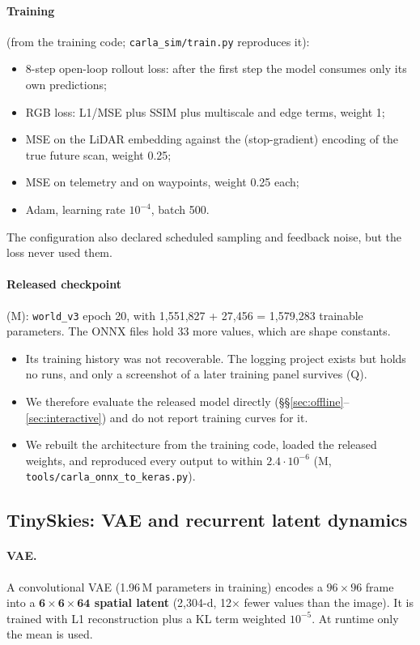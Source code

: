 \documentclass[11pt]{article}
\begin{document}
\paragraph{Training} (from the training code; \texttt{carla\_sim/train.py} reproduces it):
\begin{itemize}
  \item 8-step open-loop rollout loss: after the first step the model consumes only its own predictions;
  \item RGB loss: L1/MSE plus SSIM plus multiscale and edge terms, weight 1;
  \item MSE on the LiDAR embedding against the (stop-gradient) encoding of the true future scan, weight 0.25;
  \item MSE on telemetry and on waypoints, weight 0.25 each;
  \item Adam, learning rate $10^{-4}$, batch 500.
\end{itemize}
The configuration also declared scheduled sampling and feedback noise, but the loss never used them.

\paragraph{Released checkpoint} (M): \texttt{world\_v3} epoch 20, with 1,551,827 + 27,456 = 1,579,283 trainable parameters. The ONNX files hold 33 more values, which are shape constants.
\begin{itemize}
  \item Its training history was not recoverable. The logging project exists but holds no runs, and only a screenshot of a later training panel survives (Q).
  \item We therefore evaluate the released model directly (\S\S\ref{sec:offline}--\ref{sec:interactive}) and do not report training curves for it.
  \item We rebuilt the architecture from the training code, loaded the released weights, and reproduced every output to within $2.4\cdot10^{-6}$ (M, \texttt{tools/carla\_onnx\_to\_keras.py}).
\end{itemize}

\subsection{TinySkies: VAE and recurrent latent dynamics}
\label{sec:tinyskies-model}

\paragraph{VAE.} A convolutional VAE (1.96\,M parameters in training) encodes a $96\times96$ frame into a \textbf{$\bm{6\times6\times64}$ spatial latent} (2,304-d, 12$\times$ fewer values than the image). It is trained with L1 reconstruction plus a KL term weighted $10^{-5}$. At runtime only the mean is used.
\end{document}
